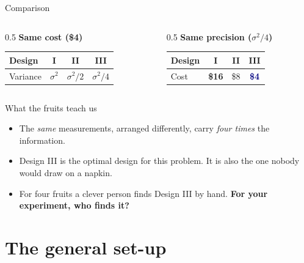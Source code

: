 \documentclass[aspectratio=169,10pt]{beamer}
\newcommand{\hl}[1]{\textcolor{brick}{\textbf{#1}}}
\newcommand{\key}[1]{\textcolor{navy}{\textbf{#1}}}
\begin{document}
\begin{frame}{Comparison}
  \begin{columns}[T]
    \begin{column}{0.5\textwidth}
      \centering
      \textbf{Same cost (\$4)}\\[4pt]
      \begin{tabular}{lccc}\toprule
        Design   & I          & II           & III \\ \midrule
        Variance & $\sigma^2$ & $\sigma^2/2$ & $\sigma^2/4$ \\ \bottomrule
      \end{tabular}
    \end{column}
    \begin{column}{0.5\textwidth}
      \centering
      \textbf{Same precision ($\sigma^2/4$)}\\[4pt]
      \begin{tabular}{lccc}\toprule
        Design & I    & II  & III \\ \midrule
        Cost   & \hl{\$16} & \$8 & \key{\$4} \\ \bottomrule
      \end{tabular}
    \end{column}
  \end{columns}
  \vspace{1.5em}
  \begin{block}{What the fruits teach us}
    \begin{itemize}
      \item The \emph{same} measurements, arranged differently, carry \emph{four times} the information.
      \item Design III is the optimal design for this problem. It is also the one nobody would draw on a napkin.
      \item For four fruits a clever person finds Design III by hand. \hl{For your experiment, who finds it?}
    \end{itemize}
  \end{block}
\end{frame}

\section{The general set-up}
\end{document}
